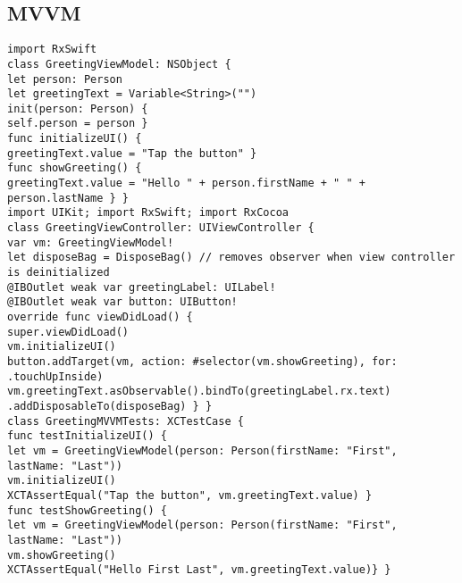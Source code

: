 \subsection{MVVM}
%
%

\begin{lstlisting}
import RxSwift
class GreetingViewModel: NSObject {
let person: Person
let greetingText = Variable<String>("")
init(person: Person) {
self.person = person }
func initializeUI() {
greetingText.value = "Tap the button" }
func showGreeting() {
greetingText.value = "Hello " + person.firstName + " " + person.lastName } }
import UIKit; import RxSwift; import RxCocoa
class GreetingViewController: UIViewController {
var vm: GreetingViewModel!
let disposeBag = DisposeBag() // removes observer when view controller is deinitialized
@IBOutlet weak var greetingLabel: UILabel!
@IBOutlet weak var button: UIButton!
override func viewDidLoad() {
super.viewDidLoad()
vm.initializeUI()
button.addTarget(vm, action: #selector(vm.showGreeting), for: .touchUpInside)
vm.greetingText.asObservable().bindTo(greetingLabel.rx.text)
.addDisposableTo(disposeBag) } }
class GreetingMVVMTests: XCTestCase {
func testInitializeUI() {
let vm = GreetingViewModel(person: Person(firstName: "First", lastName: "Last"))
vm.initializeUI()
XCTAssertEqual("Tap the button", vm.greetingText.value) }
func testShowGreeting() {
let vm = GreetingViewModel(person: Person(firstName: "First", lastName: "Last"))
vm.showGreeting()
XCTAssertEqual("Hello First Last", vm.greetingText.value)} }
\end{lstlisting}

